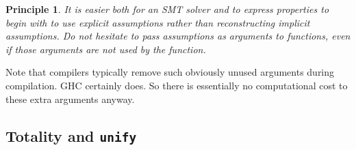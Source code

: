 \documentclass[sigconf, review]{acmart}
\newcommand{\tc}[1]{{\small\texttt{#1}}}
\newtheorem{principle}{Principle}
\begin{document}
\begin{principle}
  It is easier both for an SMT solver and to express properties to begin with to
  use explicit assumptions rather than reconstructing implicit assumptions.
  Do not hesitate to pass assumptions as arguments to functions, even if those
  arguments are not used by the function.
\end{principle}

Note that compilers typically remove such obviously unused arguments during
compilation. GHC certainly does. So there is essentially no computational cost to
these extra arguments anyway.

%
%
%

\subsection{Totality and \tc{unify}}
\label{checking-unify}
\end{document}

